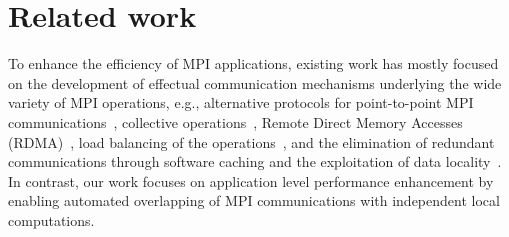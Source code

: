 
\section{Related work}
\label{sec:related}

To enhance the efficiency of MPI applications, existing work has mostly focused on
the development of effectual communication mechanisms underlying the wide variety of MPI operations,  e.g.,
alternative protocols for point-to-point MPI communications~\cite{brightwell:eurompi03,denis:eurompi11},
collective operations~\cite{traff:eurompi14:ocd,traff:eurompi14:mcd,graham:eurompi08,mittal:ppopp12},
Remote Direct Memory Accesses (RDMA)~\cite{liu:ics03,woodall:eurompi06,hatanaka:eurompi13},
load balancing of the operations~\cite{nian:niss09,kale:eurompi14},
and the elimination of redundant communications through software caching and the exploitation of data locality~\cite{buntinas:icpp09,isujita:eurompi14,ozog:ics13}.
In contrast, our work focuses on application level performance enhancement by enabling automated overlapping of MPI communications with independent local computations.


